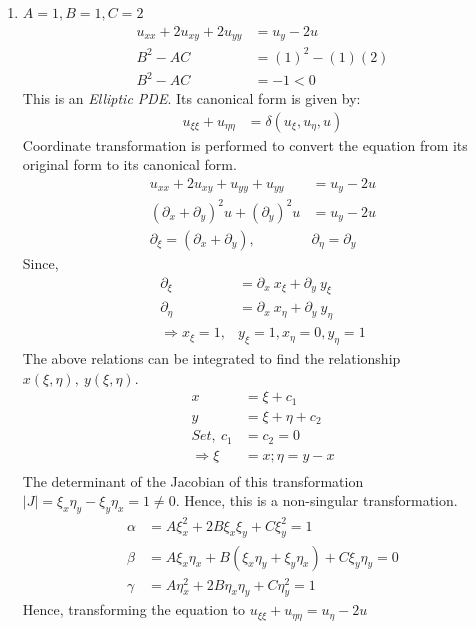 \documentclass[11pt]{article}
\begin{document}
\begin{enumerate}
\begin{enumerate}[label=(\alph*)]
\item{\color{blue} $A = 1, B = 1, C = 2$}
\begin{align*}
u_{xx} + 2u_{xy} + 2u_{yy} & = u_y - 2u \\
B^2 - AC & = (1)^2 - (1)(2) \\
B^2 - AC & = -1 < 0
\end{align*}
This is  an \textit{Elliptic PDE}. Its canonical form is given by:
\begin{align*}
u_{\xi\xi} + u_{\eta\eta} & = \delta(u_\xi, u_\eta, u)
\end{align*}
Coordinate transformation is performed to convert the equation from its original form to its canonical form. 
\begin{align*}
u_{xx} + 2u_{xy} + u_{yy} + u_{yy} & = u_y - 2u \\
\left(\partial_x + \partial_y \right)^2u + (\partial_y)^2u & = u_y - 2u \\
\partial_\xi = \left(\partial_x + \partial_y \right), & \partial_\eta = \partial_y
\end{align*}
Since, 
\begin{align*}
\partial_\xi & = \partial_x \ x_\xi + \partial_y \ y_\xi \\
\partial_\eta & = \partial_x \ x_\eta + \partial_y \ y_\eta \\
\Rightarrow x_\xi = 1, & y_\xi = 1, x_\eta = 0, y_\eta = 1
\end{align*}
The above relations can be integrated to find the relationship $x(\xi,\eta), \ y(\xi,\eta)$. 
\begin{align*}
x & = \xi + c_1 \\
y & = \xi + \eta + c_2\\
Set, \ c_1 & = c_2 = 0 \\
\Rightarrow \xi & = x; \eta = y-x \\
\end{align*}
The determinant of the Jacobian of this transformation $|J| = \xi_x\eta_y - \xi_y\eta_x = 1 \neq 0$. Hence, this is a non-singular transformation. 
\begin{align*}
\alpha & = A\xi^2_x + 2B\xi_x\xi_y + C\xi^2_y = 1 \\
\beta & = A\xi_x\eta_x + B\left(\xi_x\eta_y + \xi_y\eta_x \right) + C\xi_y\eta_y = 0 \\
\gamma & = A\eta^2_x + 2B\eta_x\eta_y + C\eta^2_y = 1
\end{align*}
Hence, transforming the equation to $u_{\xi\xi} + u_{\eta\eta} = u_\eta - 2u$


\end{enumerate}
\end{enumerate}
\end{document}

